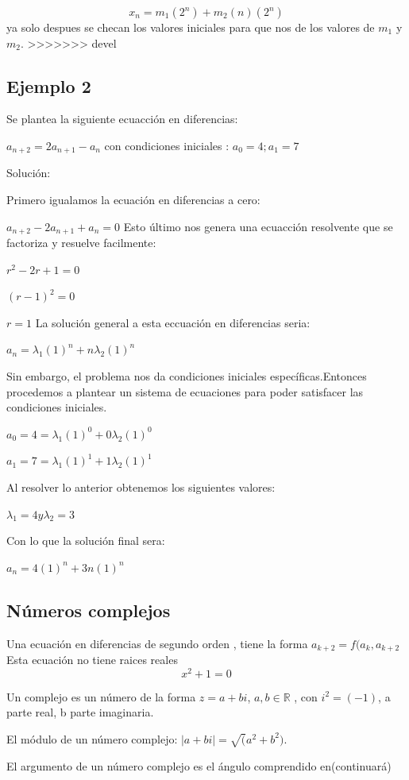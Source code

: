 \documentclass{article}
\begin{document}
{{$$x_n=m_1(2^n)+m_2(n)(2^n)$$
ya solo despues se checan los valores iniciales para que nos de los valores de $m_1$ y $m_2$.
>>>>>>> devel

\subsection{Ejemplo 2}

Se plantea la siguiente ecuacción en diferencias:

$a_{n+2}=2a_{n+1}-a_{n}$ con condiciones iniciales : $a_{0}=4 ; a_{1}=7$

Solución:

Primero igualamos la ecuación en diferencias a cero:

$a_{n+2}-2a_{n+1}+a_{n}=0$ Esto último nos genera una ecuacción resolvente que se factoriza y resuelve facilmente:

$r^2-2r+1=0$

${(r-1)^2=0}$

${r=1}$
La solución general a esta eccuación en diferencias seria:

$a_{n}=\lambda_{1}(1)^n+n\lambda_{2}(1)^n$

Sin embargo, el problema nos da condiciones iniciales específicas.Entonces procedemos a plantear un sistema de ecuaciones para poder satisfacer las condiciones iniciales.

$a_{0}=4=\lambda_{1}(1)^0+0\lambda_{2}(1)^0$

$a_{1}=7=\lambda_{1}(1)^1+1\lambda_{2}(1)^1$

Al resolver lo anterior obtenemos los siguientes valores:

$\lambda_{1}=4 y \lambda_{2}=3$

Con lo que la solución final sera:

$a_{n}=4(1)^n+3n(1)^n$


\subsection{Números  complejos}

Una ecuación en diferencias de segundo orden , tiene la forma $a_{k+2}=f(a_k ,a_{k+2}$
Esta ecuaci\'on no tiene raices reales $$x^2+1=0$$

Un complejo es un número de la forma $z=a+bi$, $a,b\in\mathbb{R}$ , con $i^2=(-1)$, a parte real, b parte imaginaria.

El módulo de un número complejo: $|a+bi|=\surd(a^2+b^2)$.


El argumento de un número complejo es el ángulo comprendido en(continuará)


}}
\end{document}
